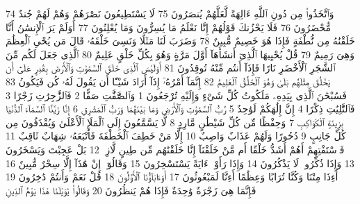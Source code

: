 {\tiny\colorbox{cl_aya}{74}} وَٱتَّخَذُوا۟ مِن دُونِ ٱللَّهِ ءَالِهَةً لَّعَلَّهُمْ يُنصَرُونَ
{\tiny\colorbox{cl_aya}{75}} لَا يَسْتَطِيعُونَ نَصْرَهُمْ وَهُمْ لَهُمْ جُندٌ مُّحْضَرُونَ
{\tiny\colorbox{cl_aya}{76}} فَلَا يَحْزُنكَ قَوْلُهُمْ إِنَّا نَعْلَمُ مَا يُسِرُّونَ وَمَا يُعْلِنُونَ
{\tiny\colorbox{cl_aya}{77}} أَوَلَمْ يَرَ ٱلْإِنسَٰنُ أَنَّا خَلَقْنَٰهُ مِن نُّطْفَةٍ فَإِذَا هُوَ خَصِيمٌ مُّبِينٌ
{\tiny\colorbox{cl_aya}{78}} وَضَرَبَ لَنَا مَثَلًا وَنَسِىَ خَلْقَهُۥ قَالَ مَن يُحْىِ ٱلْعِظَٰمَ وَهِىَ رَمِيمٌ
{\tiny\colorbox{cl_aya}{79}} قُلْ يُحْيِيهَا ٱلَّذِىٓ أَنشَأَهَآ أَوَّلَ مَرَّةٍ وَهُوَ بِكُلِّ خَلْقٍ عَلِيمٌ
{\tiny\colorbox{cl_aya}{80}} ٱلَّذِى جَعَلَ لَكُم مِّنَ ٱلشَّجَرِ ٱلْأَخْضَرِ نَارًا فَإِذَآ أَنتُم مِّنْهُ تُوقِدُونَ
{\tiny\colorbox{cl_aya}{81}} أَوَلَيْسَ ٱلَّذِى خَلَقَ ٱلسَّمَٰوَٰتِ وَٱلْأَرْضَ بِقَٰدِرٍ عَلَىٰٓ أَن يَخْلُقَ مِثْلَهُم بَلَىٰ وَهُوَ ٱلْخَلَّٰقُ ٱلْعَلِيمُ
{\tiny\colorbox{cl_aya}{82}} إِنَّمَآ أَمْرُهُۥٓ إِذَآ أَرَادَ شَيْـًٔا أَن يَقُولَ لَهُۥ كُن فَيَكُونُ
{\tiny\colorbox{cl_aya}{83}} فَسُبْحَٰنَ ٱلَّذِى بِيَدِهِۦ مَلَكُوتُ كُلِّ شَىْءٍ وَإِلَيْهِ تُرْجَعُونَ
{\tiny\colorbox{cl_aya}{1}} وَٱلصَّٰٓفَّٰتِ صَفًّا
{\tiny\colorbox{cl_aya}{2}} فَٱلزَّٰجِرَٰتِ زَجْرًا
{\tiny\colorbox{cl_aya}{3}} فَٱلتَّٰلِيَٰتِ ذِكْرًا
{\tiny\colorbox{cl_aya}{4}} إِنَّ إِلَٰهَكُمْ لَوَٰحِدٌ
{\tiny\colorbox{cl_aya}{5}} رَّبُّ ٱلسَّمَٰوَٰتِ وَٱلْأَرْضِ وَمَا بَيْنَهُمَا وَرَبُّ ٱلْمَشَٰرِقِ
{\tiny\colorbox{cl_aya}{6}} إِنَّا زَيَّنَّا ٱلسَّمَآءَ ٱلدُّنْيَا بِزِينَةٍ ٱلْكَوَاكِبِ
{\tiny\colorbox{cl_aya}{7}} وَحِفْظًا مِّن كُلِّ شَيْطَٰنٍ مَّارِدٍ
{\tiny\colorbox{cl_aya}{8}} لَّا يَسَّمَّعُونَ إِلَى ٱلْمَلَإِ ٱلْأَعْلَىٰ وَيُقْذَفُونَ مِن كُلِّ جَانِبٍ
{\tiny\colorbox{cl_aya}{9}} دُحُورًا وَلَهُمْ عَذَابٌ وَاصِبٌ
{\tiny\colorbox{cl_aya}{10}} إِلَّا مَنْ خَطِفَ ٱلْخَطْفَةَ فَأَتْبَعَهُۥ شِهَابٌ ثَاقِبٌ
{\tiny\colorbox{cl_aya}{11}} فَٱسْتَفْتِهِمْ أَهُمْ أَشَدُّ خَلْقًا أَم مَّنْ خَلَقْنَآ إِنَّا خَلَقْنَٰهُم مِّن طِينٍ لَّازِبٍۭ
{\tiny\colorbox{cl_aya}{12}} بَلْ عَجِبْتَ وَيَسْخَرُونَ
{\tiny\colorbox{cl_aya}{13}} وَإِذَا ذُكِّرُوا۟ لَا يَذْكُرُونَ
{\tiny\colorbox{cl_aya}{14}} وَإِذَا رَأَوْا۟ ءَايَةً يَسْتَسْخِرُونَ
{\tiny\colorbox{cl_aya}{15}} وَقَالُوٓا۟ إِنْ هَٰذَآ إِلَّا سِحْرٌ مُّبِينٌ
{\tiny\colorbox{cl_aya}{16}} أَءِذَا مِتْنَا وَكُنَّا تُرَابًا وَعِظَٰمًا أَءِنَّا لَمَبْعُوثُونَ
{\tiny\colorbox{cl_aya}{17}} أَوَءَابَآؤُنَا ٱلْأَوَّلُونَ
{\tiny\colorbox{cl_aya}{18}} قُلْ نَعَمْ وَأَنتُمْ دَٰخِرُونَ
{\tiny\colorbox{cl_aya}{19}} فَإِنَّمَا هِىَ زَجْرَةٌ وَٰحِدَةٌ فَإِذَا هُمْ يَنظُرُونَ
{\tiny\colorbox{cl_aya}{20}} وَقَالُوا۟ يَٰوَيْلَنَا هَٰذَا يَوْمُ ٱلدِّينِ
